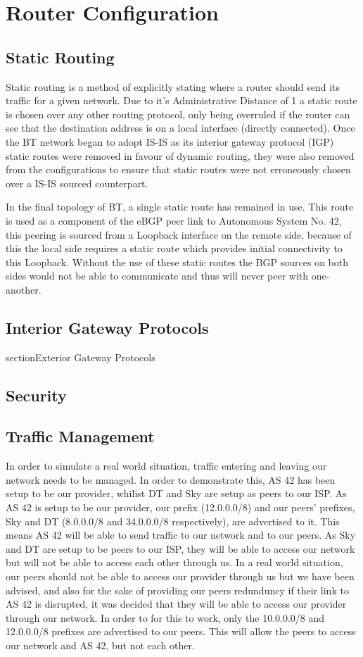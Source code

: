 \chapter{Router Configuration} \section{Static Routing} Static routing is a
method of explicitly stating where a router should send its traffic for a given
network. Due to it's Administrative Distance of 1 a static route is chosen over
any other routing protocol, only being overruled if the router can see that the
destination address is on a local interface (directly connected). Once the BT
network began to adopt IS-IS as its interior gateway protocol (IGP) static
routes were removed in favour of dynamic routing, they were also removed from
the configurations to ensure that static routes were not erroneously chosen over
a IS-IS sourced counterpart.

In the final topology of BT, a single static route has remained in use. This
route is used as a component of the eBGP peer link to Autonomous System No. 42,
this peering is sourced from a Loopback interface on the remote side, because of
this the local side requires a static route which provides initial connectivity
to this Loopback. Without the use of these static routes the BGP sources on both
sides would not be able to communicate and thus will never peer with one-
another.

\section{Interior Gateway Protocols} section{Exterior Gateway Protocols}
\section{Security}

\section{Traffic Management}
In order to simulate a real world situation, traffic entering and leaving our
network needs to be managed. In order to demonstrate this, AS 42 has been setup
to be our provider, whilist DT and Sky are setup as peers to our ISP. As AS 42
is setup to be our provider, our prefix (12.0.0.0/8) and our peers' prefixes,
Sky and DT (8.0.0.0/8 and 34.0.0.0/8 respectively), are advertised to it. This
means AS 42 will be able to send traffic to our network and to our peers. As Sky
and DT are setup to be peers to our ISP, they will be able to access our network
but will not be able to access each other through us. In a real world situation,
our peers should not be able to access our provider through us but we have been
advised, and also for the sake of providing our peers redunduncy if their link
to AS 42 is disrupted, it was decided that they will be able to access our
provider through our network. In order to for this to work, only the 10.0.0.0/8
and 12.0.0.0/8 prefixes are advertised to our peers. This will allow the peers
to access our network and AS 42, but not each other.
